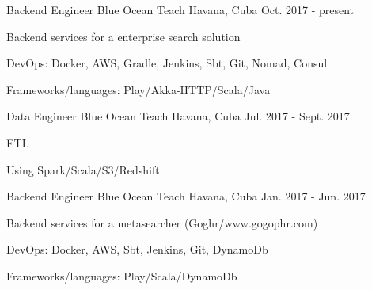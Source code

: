 


\begin{cventries}


\cventry
{Backend Engineer} %
{Blue Ocean Teach} %
{Havana, Cuba} %
{Oct. 2017 - present} %
{ %
\begin{cvitems}
  \item {Backend services for a enterprise search solution}
  \item {DevOps: Docker, AWS, Gradle, Jenkins, Sbt, Git, Nomad, Consul}
  \item {Frameworks/languages: Play/Akka-HTTP/Scala/Java}
\end{cvitems}
}



\cventry
{Data Engineer} %
{Blue Ocean Teach} %
{Havana, Cuba} %
{Jul. 2017 - Sept. 2017} %
{ %
\begin{cvitems}
  \item {ETL}
  \item {Using Spark/Scala/S3/Redshift}
\end{cvitems}
}



\cventry
{Backend Engineer} %
{Blue Ocean Teach} %
{Havana, Cuba} %
{Jan. 2017 - Jun. 2017} %
{ %
\begin{cvitems}
  \item {Backend services for a metasearcher (Goghr/www.gogophr.com)}
  \item {DevOps: Docker, AWS, Sbt, Jenkins, Git, DynamoDb}
  \item {Frameworks/languages: Play/Scala/DynamoDb}
\end{cvitems}
}


\end{cventries}
